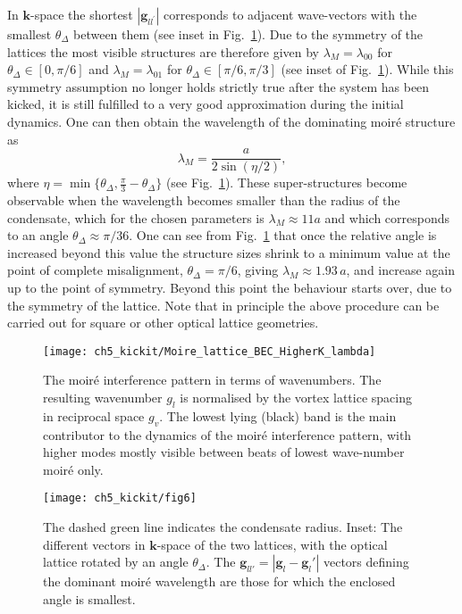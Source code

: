     In $\mathbf{k}$-space the shortest $|\mathbf{g}_{ll^\prime}|$ corresponds to adjacent wave-vectors with the smallest $\theta_\Delta$ between them (see inset in Fig.~\ref{fig:moire_lambda_1}). Due to the symmetry of the lattices the most visible structures are therefore given by $\lambda_M=\lambda_{00}$ for $\theta_\Delta\in[0,\pi/6]$ and $\lambda_M=\lambda_{01}$ for $\theta_\Delta\in[\pi/6,\pi/3]$ (see inset of Fig.~\ref{fig:moire_lambda_1}).
    While this symmetry assumption no longer holds strictly true after the system has been kicked, it is still fulfilled to a very good approximation during the initial dynamics. One can then obtain the wavelength of the dominating moir\'e structure as~\cite{BIO:Blair_jneur_2007,SS:Yankowitz_natphys_2012}
    		\begin{equation}
    		\lambda_M = \frac{a}{2\sin(\eta/2)},
    		\label{eqn:moire_size}
    	\end{equation}
    where $\eta=\min\{\theta_\Delta,\frac{\pi}{3} - \theta_\Delta \} $  (see Fig.~\ref{fig:moire_lambda_1}).
These super-structures become observable when the wavelength becomes smaller than the radius of the condensate, which for the chosen parameters is $\lambda_M \approx 11a$ and which corresponds to an angle $\theta_\Delta \approx \pi/36$.
One can see from Fig.~\ref{fig:moire_lambda_1} that once the relative angle is increased beyond this value the structure sizes shrink to a minimum value at the point of complete misalignment, $\theta_\Delta=\pi/6$, giving $\lambda_M\approx 1.93\,a$, and increase again up to the point of symmetry. Beyond this point the behaviour starts over, due to the symmetry of the lattice. Note that in principle the above procedure can be carried out for square or other optical lattice geometries.

\begin{figure}[tb]
    \centering

	\texttt{[image: ch5\_kickit/Moire\_lattice\_BEC\_HigherK\_lambda]}
    \caption[The moir\'e interference pattern in terms of wavenumbers.]{The moir\'e interference pattern in terms of wavenumbers. The resulting wavenumber $g_l$ is normalised by the vortex lattice spacing in reciprocal space $g_v$. The lowest lying (black) band is the main contributor to the dynamics of the moir\'e interference pattern, with higher modes mostly visible between beats of lowest wave-number moir\'e only.}
\end{figure}



\begin{figure}[tb]
    \centering

	\texttt{[image: ch5\_kickit/fig6]}
	\caption[Size of the resulting moir\'e super-structures as a function of the relative angle between the vortex and optical lattice.]{The dashed green line indicates the condensate radius. Inset: The different vectors in $\mathbf{k}$-space of the two lattices, with the optical lattice rotated by an angle $\theta_\Delta$. The $\mathbf{g}_{ll'} = |\mathbf{g}_l - \mathbf{g}_l'|$ vectors defining the dominant moir\'e wavelength are those for which the enclosed angle is smallest. }
	\label{fig:moire_lambda_1}
\end{figure}

